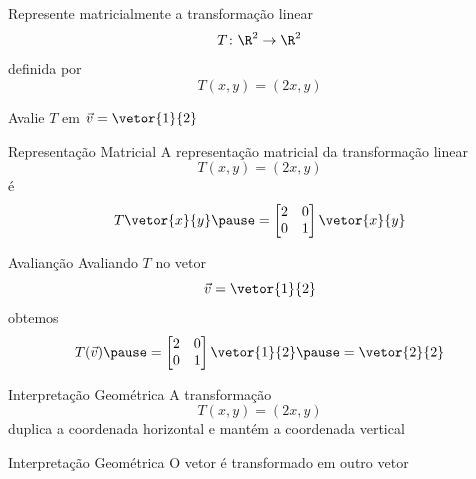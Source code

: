 \begin{question}
  Represente matricialmente a transformação linear
  \[
    T\colon \R^2 \to \R^2
  \]
  definida por
  \[
    T(x, y) = ( 2x, y )
  \]

  \medskip
  Avalie $T$ em
  \(
    \vec{v} = \vetor{1}{2}
  \)
\end{question}

\begin{resolution}{Representação Matricial}
    A representação matricial da transformação linear
    \[
        T(x, y) = (2x, y)
    \]
    \pause
    é
    \[
      T \vetor{x}{y}
      \pause
      = \begin{bmatrix}
          2 & 0\\
          0 & 1
      \end{bmatrix}
      \vetor{x}{y}
    \]
\end{resolution}

\begin{resolution}{Avalianção}
  Avaliando $T$ no vetor
  \[
    \vec{v} = \vetor{1}{2}
  \]
  \pause
  obtemos
  \[
    T(\vec{v})
    \pause
    = \begin{bmatrix}
        2 & 0\\
        0 & 1
    \end{bmatrix}
    \vetor{1}{2}
    \pause
    = \vetor{2}{2}
  \]
\end{resolution}

\begin{resolution}{Interpretação Geométrica}
  A transformação
  \[
      T(x, y) = (2x, y)
  \]
  \pause
  duplica a coordenada horizontal e mantém a coordenada vertical
\end{resolution}

\begin{resolution}{Interpretação Geométrica}
  O vetor é transformado em outro vetor

\pause
\begin{center}
\end{center}
\end{resolution}

\endinput
